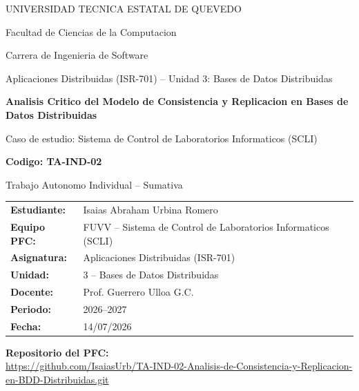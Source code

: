 \documentclass[11pt,a4paper]{article}
\newcommand{\nombreEstudiante}{Isaias Abraham Urbina Romero}
\newcommand{\equipoPFC}{FUVV -- Sistema de Control de Laboratorios Informaticos (SCLI)}
\newcommand{\fechaEntrega}{14/07/2026}
\newcommand{\repoPFC}{\url{https://github.com/IsaiasUrb/TA-IND-02-Analisis-de-Consistencia-y-Replicacion-en-BDD-Distribuidas.git}}
\begin{document}
\begin{titlepage}
\centering
\vspace*{1cm}

{\large UNIVERSIDAD TECNICA ESTATAL DE QUEVEDO\par}
{\large Facultad de Ciencias de la Computacion\par}
{\large Carrera de Ingenieria de Software\par}
\vspace{0.3cm}
{\normalsize Aplicaciones Distribuidas (ISR-701) -- Unidad 3: Bases de Datos Distribuidas\par}

\vspace{2.5cm}

{\Huge\bfseries Analisis Critico del Modelo de Consistencia y Replicacion en Bases de Datos Distribuidas\par}

\vspace{0.8cm}

{\Large Caso de estudio: Sistema de Control de Laboratorios Informaticos (SCLI)\par}

\vspace{1.5cm}

{\large\bfseries Codigo: TA-IND-02\par}
\vspace{0.3cm}
{\large Trabajo Autonomo Individual -- Sumativa\par}

\vspace{2.5cm}

\begin{tabular}{ll}
\textbf{Estudiante:} & \nombreEstudiante \\[0.3cm]
\textbf{Equipo PFC:} & \equipoPFC \\[0.3cm]
\textbf{Asignatura:} & Aplicaciones Distribuidas (ISR-701) \\[0.3cm]
\textbf{Unidad:} & 3 -- Bases de Datos Distribuidas \\[0.3cm]
\textbf{Docente:} & Prof. Guerrero Ulloa G.C. \\[0.3cm]
\textbf{Periodo:} & 2026--2027 \\[0.3cm]
\textbf{Fecha:} & \fechaEntrega \\
\end{tabular}

\vspace{1.2cm}
{\small\textbf{Repositorio del PFC:} \\[0.15cm] \small\repoPFC \par}

\vfill
\end{titlepage}
\end{document}
